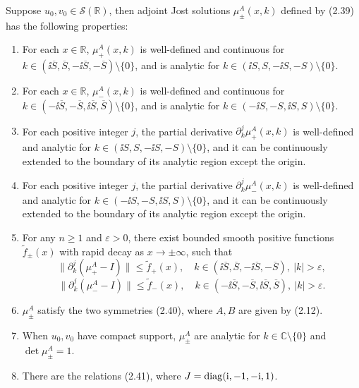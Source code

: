 \begin{paperpropositionen}\label{prop:2.5}
Suppose $u_0,v_0\in\mathcal S(\mathbb R)$, then adjoint Jost solutions $\mu_\pm^A(x,k)$ defined by (2.39) has the following properties:
\begin{enumerate}[label=\alph*.]
\item For each $x\in\mathbb R$, $\mu_+^A(x,k)$ is well-defined and continuous for $k\in(\ii\overline S,\overline S,-\ii\overline S,-\overline S)\setminus\{0\}$, and is analytic for $k\in(\ii S,S,-\ii S,-S)\setminus\{0\}$.
\item For each $x\in\mathbb R$, $\mu_-^A(x,k)$ is well-defined and continuous for $k\in(-\ii\overline S,-\overline S,\ii\overline S,\overline S)\setminus\{0\}$, and is analytic for $k\in(-\ii S,-S,\ii S,S)\setminus\{0\}$.
\item For each positive integer $j$, the partial derivative $\partial_k^j\mu_+^A(x,k)$ is well-defined and analytic for $k\in(\ii S,S,-\ii S,-S)\setminus\{0\}$, and it can be continuously extended to the boundary of its analytic region except the origin.
\item For each positive integer $j$, the partial derivative $\partial_k^j\mu_-^A(x,k)$ is well-defined and analytic for $k\in(-\ii S,-S,\ii S,S)\setminus\{0\}$, and it can be continuously extended to the boundary of its analytic region except the origin.
\item For any $n\ge1$ and $\varepsilon>0$, there exist bounded smooth positive functions $\widetilde f_\pm(x)$ with rapid decay as $x\to\pm\infty$, such that
\[
\|\partial_k^j(\mu_+^A-I)\|\le\widetilde f_+(x),\quad
k\in(\ii\overline S,\overline S,-\ii\overline S,-\overline S),\ |k|>\varepsilon,
\]
\[
\|\partial_k^j(\mu_-^A-I)\|\le\widetilde f_-(x),\quad
k\in(-\ii\overline S,-\overline S,\ii\overline S,\overline S),\ |k|>\varepsilon.
\]
\item $\mu_\pm^A$ satisfy the two symmetries (2.40), where $A,B$ are given by (2.12).
\item When $u_0,v_0$ have compact support, $\mu_\pm^A$ are analytic for $k\in\mathbb C\setminus\{0\}$ and $\det\mu_\pm^A=1$.
\item There are the relations (2.41), where $J=\operatorname{diag}(\mathrm{i},-1,-\mathrm{i},1)$.
\end{enumerate}
\end{paperpropositionen}
